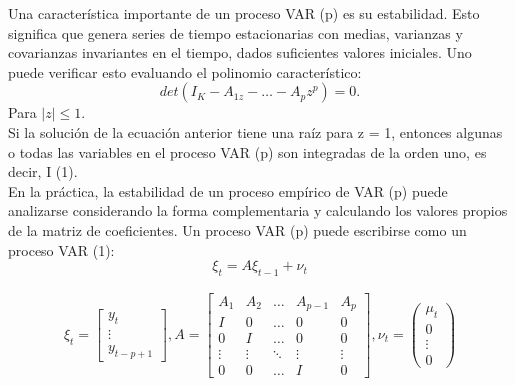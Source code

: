 	
	Una caracter\'{i}stica importante de un proceso VAR (p) es su estabilidad. Esto significa que genera series de tiempo estacionarias con medias, varianzas y covarianzas  invariantes en el tiempo, dados suficientes valores iniciales. Uno puede verificar esto evaluando el polinomio caracter\'{i}stico:
	\begin{equation}
		det(I_K - A_{1z} - \dots{} - A_{p}z^p)=0.
	\end{equation}
	Para $|z|\le1$.\\
	Si la soluci\'on de la ecuaci\'on anterior tiene una ra\'{i}z para z = 1, entonces algunas o todas las variables en el proceso VAR (p) son integradas de la orden uno, es decir, I (1).\\
	
	
	
	En la pr\'actica, la estabilidad de un proceso emp\'{i}rico de VAR (p) puede analizarse considerando la forma complementaria y calculando los valores propios de la matriz de coeficientes. Un proceso VAR (p) puede escribirse como un proceso VAR (1):
	\begin{equation*}
	\xi_t=A\xi_{t-1}+\nu_t
	\end{equation*}
	
	\begin{gather*}
	\xi_t=\begin{bmatrix} y_{t} \\ \vdots{} \\ y_{t-p+1} \end{bmatrix}
	,
	A=\begin{bmatrix} A_{1} & A_{2} & \dots{} & A_{p-1} & A_{p} \\
	I & 0 & \dots{} & 0 & 0 \\
	0 & I & \dots{} & 0 & 0 \\
	\vdots{} & \vdots{} & \ddots{} & \vdots{} & \vdots{} \\
	0 & 0 & \dots{} & I & 0 
	\end{bmatrix}
	,
	\nu_t=\begin{pmatrix} \mu_{t} \\ 0 \\ \vdots{} \\ 0 \end{pmatrix}
	\end{gather*}
	
